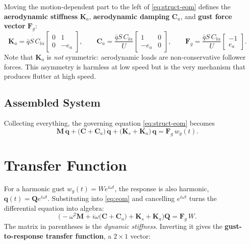 \documentclass[11pt]{article}
\begin{document}
Moving the motion-dependent part to the left of \eqref{eq:struct-eom} defines the
\textbf{aerodynamic stiffness} $\mathbf K_a$, \textbf{aerodynamic damping} $\mathbf C_a$, and \textbf{gust force vector} $\mathbf F_g$:
\begin{equation}
\boxed{\ \mathbf K_a = \bar{q} S\, C_{l\alpha}\!
\begin{bmatrix} 0 & 1 \\ 0 & -e_a \end{bmatrix},\qquad
\mathbf C_a = \frac{\bar{q} S\, C_{l\alpha}}{U}\!
\begin{bmatrix} 1 & 0 \\ -e_a & 0 \end{bmatrix},\qquad
\mathbf F_g = \frac{\bar{q} S\, C_{l\alpha}}{U}\!
\begin{bmatrix} -1 \\ e_a \end{bmatrix}.\ }
\end{equation}
Note that $\mathbf K_a$ is \emph{not} symmetric: aerodynamic loads are
non-conservative follower forces. This asymmetry is harmless at low speed but is
the very mechanism that produces flutter at high speed.

\subsection{Assembled System}
Collecting everything, the governing equation \eqref{eq:struct-eom} becomes
\begin{equation}
\boxed{\ \mathbf M\,\ddot{\mathbf q}
+ \big(\mathbf C + \mathbf C_a\big)\,\dot{\mathbf q}
+ \big(\mathbf K_s + \mathbf K_a\big)\,\mathbf q
= \mathbf F_g\, w_g(t).\ }
\label{eq:eom}
\end{equation}

\section{Transfer Function}
For a harmonic gust $w_g(t)=W e^{i\omega t}$, the response is also harmonic,
$\mathbf q(t)=\mathbf Q e^{i\omega t}$. Substituting into \eqref{eq:eom} and
cancelling $e^{i\omega t}$ turns the differential equation into algebra:
\begin{equation}
\big(-\omega^2\mathbf M + i\omega\big(\mathbf C + \mathbf C_a\big) + \mathbf K_s + \mathbf K_a\big)
\mathbf Q = \mathbf F_g\, W .
\end{equation}
The matrix in parentheses is the \emph{dynamic stiffness}. Inverting it gives the
\textbf{gust-to-response transfer function}, a $2\times1$ vector:
\end{document}
